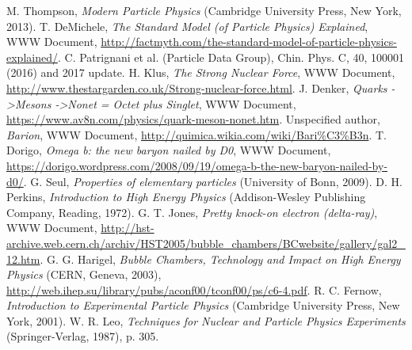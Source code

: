 \documentclass[twocolumn]{article}
\begin{document}
\begin{thebibliography}{9}
M. Thompson, \textsl{Modern Particle Physics} (Cambridge University Press, New York, 2013).
T. DeMichele, \textit{The Standard Model (of Particle Physics) Explained}, WWW Document, \url{http://factmyth.com/the-standard-model-of-particle-physics-explained/}.
C. Patrignani et al. (Particle Data Group), Chin. Phys. C, 40, 100001 (2016) and 2017 update.
H. Klus, \textit{The Strong Nuclear Force}, WWW Document, \url{http://www.thestargarden.co.uk/Strong-nuclear-force.html}.
J. Denker, \textit{Quarks -\textgreater Mesons -\textgreater Nonet = Octet plus Singlet}, WWW Document, \url{https://www.av8n.com/physics/quark-meson-nonet.htm}.
Unspecified author, \textit{Barion}, WWW Document, \url{http://quimica.wikia.com/wiki/Bari\%C3\%B3n}.
T. Dorigo, \textit{Omega b: the new baryon nailed by D0}, WWW Document, \url{https://dorigo.wordpress.com/2008/09/19/omega-b-the-new-baryon-nailed-by-d0/}.
G. Seul, \textsl{Properties of elementary particles} (University of Bonn, 2009).
D. H. Perkins, \textsl{Introduction to High Energy Physics} (Addison-Wesley Publishing Company, Reading, 1972).
G. T. Jones, \textsl{Pretty knock-on electron (delta-ray)}, WWW Document, \url{http://hst-archive.web.cern.ch/archiv/HST2005/bubble_chambers/BCwebsite/gallery/gal2_12.htm}.
G. G. Harigel, \textsl{Bubble Chambers, Technology and Impact on High Energy Physics} (CERN, Geneva, 2003), \url{http://web.ihep.su/library/pubs/aconf00/tconf00/ps/c6-4.pdf}.
R. C. Fernow, \textsl{Introduction to Experimental Particle Physics} (Cambridge University Press, New York, 2001).
W. R. Leo, \textsl{Techniques for Nuclear and Particle Physics Experiments} (Springer-Verlag, 1987), p. 305.
\iffalse
\bibitem{book}
K. Siegbahn, \textsl{Alpha-, beta-, and gamma-ray spectroscopy, Vol. 2} (North Holland Publishing Company, Amsterdam, 1965).
 \bibitem{link}
 W. U. Boeglin, \textit{Scintillation Detectors}, WWW Document, \url{http://wanda.fiu.edu/teaching/courses/Modern_lab_manual/scintillator.html}.
\bibitem{pdf_on_website}
Unspecified author, \textsl{Gamma Ray Spectroscopy} (University of Florida, 2013), \url{https://www.phys.ufl.edu/courses/phy4803L/group_I/gamma_spec/gamspec.pdf}.
\bibitem{cfd}
E. Ermis and C. Celiktas, International Journal Of Instrumentation Science 1, (2013), pp.54-62.
\bibitem{signal}
M. Nakhostin, \textsl{Signal Processing for Radiation Detectors} (John Wiley $\&$ Sons, 2018), p. 298\footnote{Relevant pages (chapter 6) available for preview under\\ \url{https://books.google.de/books?id=Lrg4DwAAQBAJ}}.
\bibitem{meliss}
A. C. Melissinos, J. Napolitano, \textsl{Experiments in Modern Physics, 2\textsuperscript{nd} edition} (Academic Press, San Diego, 2003), pp 419-21.
\fi
\end{thebibliography}
\end{document}
